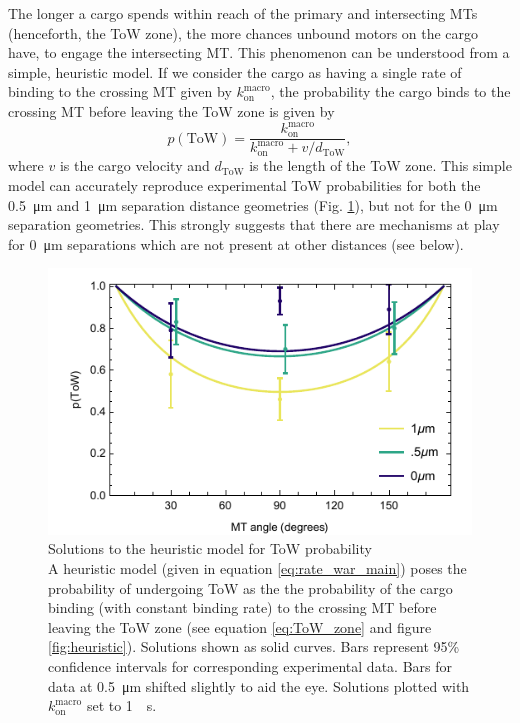 The longer a cargo spends within reach of the primary and intersecting MTs (henceforth, the ToW zone), the more chances unbound motors on the cargo have, to engage the intersecting MT. This phenomenon can be understood from a simple, heuristic model. If we consider the cargo as having a single rate of binding to the crossing MT given by $k_{\text{on}}^\text{macro}$, the probability the cargo binds to the crossing MT before leaving the ToW zone is given by 
\begin{equation} \label{eq:rate_war_main}
p(\text{ToW})=\frac{k_{\text{on}}^\text{macro}}{k_{\text{on}}^\text{macro} +  v / d_\text{ToW} },
\end{equation}
where $v$ is the cargo velocity and $d_\text{ToW}$ is the length of the ToW zone. This simple model can accurately reproduce experimental ToW probabilities for both the \SI{.5}{\micro\meter} and \SI{1}{\micro\meter} separation distance geometries (Fig. \ref{fig:heuristicEXP}), but not for the \SI{0}{\micro\meter} separation geometries. This strongly suggests that there are mechanisms at play for \SI{0}{\micro\meter} separations which are not present at other distances (see below).

\begin{figure}
\centering
\includegraphics[width=12cm]{appendix2/heuristicEXP.pdf}
\caption[Solutions to the heuristic model for ToW probability]{Solutions to the heuristic model for ToW probability \\
A heuristic model (given in equation \ref{eq:rate_war_main}) poses the probability of undergoing ToW as the the probability of the cargo binding (with constant binding rate) to the crossing MT before leaving the ToW zone (see equation \ref{eq:ToW_zone} and figure \ref{fig:heuristic}). 
Solutions shown as solid curves. Bars represent 95\% confidence intervals for corresponding experimental data. Bars for data at \SI{.5}{\micro\meter} shifted slightly to aid the eye. Solutions plotted with $k_\text{on}^\text{macro}$ set to \SI{1}{\per\second}.
} \label{fig:heuristicEXP}
\end{figure}

